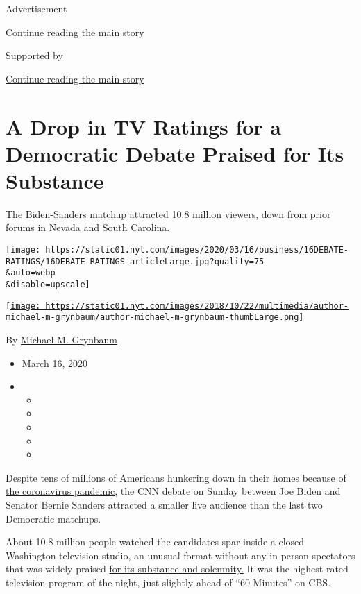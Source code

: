 Advertisement

\protect\hyperlink{after-top}{Continue reading the main story}

Supported by

\protect\hyperlink{after-sponsor}{Continue reading the main story}

\hypertarget{a-drop-in-tv-ratings-for-a-democratic-debate-praised-for-its-substance}{%
\section{A Drop in TV Ratings for a Democratic Debate Praised for Its
Substance}\label{a-drop-in-tv-ratings-for-a-democratic-debate-praised-for-its-substance}}

The Biden-Sanders matchup attracted 10.8 million viewers, down from
prior forums in Nevada and South Carolina.

\texttt{[image: https://static01.nyt.com/images/2020/03/16/business/16DEBATE-RATINGS/16DEBATE-RATINGS-articleLarge.jpg?quality=75\\\&auto=webp\\\&disable=upscale]}

\href{https://www.nytimes.com/by/michael-m-grynbaum}{\texttt{[image: https://static01.nyt.com/images/2018/10/22/multimedia/author-michael-m-grynbaum/author-michael-m-grynbaum-thumbLarge.png]}}

By \href{https://www.nytimes.com/by/michael-m-grynbaum}{Michael M.
Grynbaum}

\begin{itemize}
\item
  March 16, 2020
\item
  \begin{itemize}
  \item
  \item
  \item
  \item
  \item
  \end{itemize}
\end{itemize}

Despite tens of millions of Americans hunkering down in their homes
because of
\href{https://www.nytimes.com/2020/03/16/world/live-coronavirus-news-updates.html}{the
coronavirus pandemic,} the CNN debate on Sunday between Joe Biden and
Senator Bernie Sanders attracted a smaller live audience than the last
two Democratic matchups.

About 10.8 million people watched the candidates spar inside a closed
Washington television studio, an unusual format without any in-person
spectators that was widely praised
\href{https://www.nytimes.com/2020/03/16/us/politics/takeaways-march-democratic-debate.html}{for
its substance and solemnity.} It was the highest-rated television
program of the night, just slightly ahead of ``60 Minutes'' on CBS.


